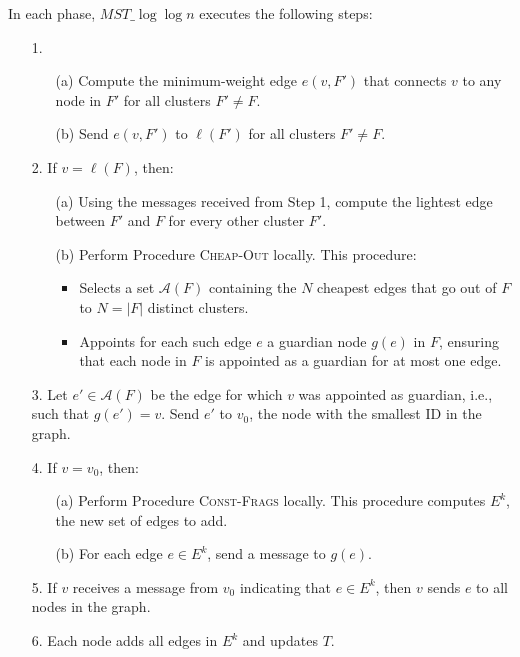 \documentclass[english, 12pt, a4paper, elec, utf8, a-2b, online]{aaltothesis}
\newcommand{\mstalgo}{$MST\_\log\log{n}$}
\begin{document}
In each phase, \mstalgo{} executes the following steps:

\begin{itemize}
	\item[1.] 
	\begin{itemize}
		\item[(a)] Compute the minimum-weight edge $e(v, F')$ that connects $v$ to any node in $F'$ for all clusters $F' \neq F$.
		\item[(b)] Send $e(v, F')$ to $\ell(F')$ for all clusters $F' \neq F$.
	\end{itemize}

	\item[2.] If $v = \ell(F)$, then:
	\begin{itemize}
		\item[(a)] Using the messages received from Step 1, compute the lightest edge between $F'$ and $F$ for every other cluster $F'$.
		\item[(b)] Perform Procedure \textsc{Cheap-Out} locally. This procedure:
		\begin{itemize}
			\item Selects a set $\mathcal{A}(F)$ containing the $N$ cheapest edges that go out of $F$ to $N = |F|$ distinct clusters.
			\item Appoints for each such edge $e$ a guardian node $g(e)$ in $F$, ensuring that each node in $F$ is appointed as a guardian for at most one edge.
		\end{itemize}
	\end{itemize}

	\item[3.] Let $e' \in \mathcal{A}(F)$ be the edge for which $v$ was appointed as guardian, i.e., such that $g(e') = v$. Send $e'$ to $v_0$, the node with the smallest ID in the graph.

	\item[4.] If $v = v_0$, then:
	\begin{itemize}
		\item[(a)] Perform Procedure \textsc{Const-Frags} locally. This procedure computes $E^k$, the new set of edges to add.
		\item[(b)] For each edge $e \in E^k$, send a message to $g(e)$.
	\end{itemize}

	\item[5.] If $v$ receives a message from $v_0$ indicating that $e \in E^k$, then $v$ sends $e$ to all nodes in the graph.

	\item[6.] Each node adds all edges in $E^k$ and updates $T$.
\end{itemize}
\end{document}
